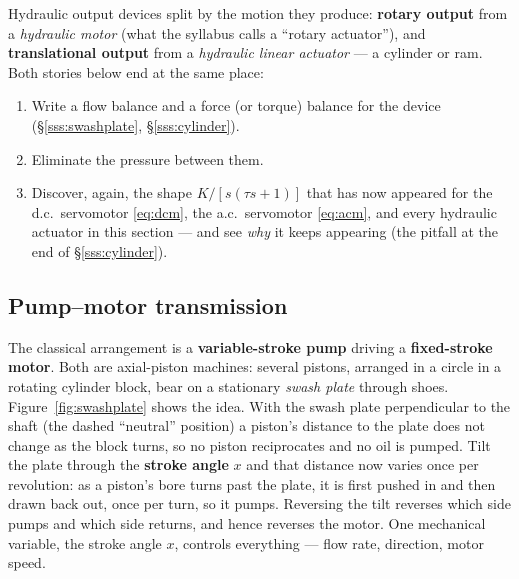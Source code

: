 \documentclass[11pt,a4paper]{article}
\begin{document}
Hydraulic output devices split by the motion they produce: \textbf{rotary
output} from a \emph{hydraulic motor} (what the syllabus calls a ``rotary
actuator''), and \textbf{translational output} from a \emph{hydraulic linear
actuator} --- a cylinder or ram. Both stories below end at the same place:
\begin{enumerate}[leftmargin=2em,itemsep=1pt]
\item Write a flow balance and a force (or torque) balance for the device
      (\S\ref{sss:swashplate}, \S\ref{sss:cylinder}).
\item Eliminate the pressure between them.
\item Discover, again, the shape $K/[s(\tau s+1)]$ that has now appeared for
      the d.c.\ servomotor \eqref{eq:dcm}, the a.c.\ servomotor \eqref{eq:acm},
      and every hydraulic actuator in this section --- and see \emph{why} it
      keeps appearing (the pitfall at the end of \S\ref{sss:cylinder}).
\end{enumerate}

\subsection{Pump--motor transmission}
\label{sec:pumpmotor}

The classical arrangement is a \textbf{variable-stroke pump} driving a
\textbf{fixed-stroke motor}. Both are axial-piston machines: several pistons,
arranged in a circle in a rotating cylinder block, bear on a stationary
\emph{swash plate} through shoes. Figure~\ref{fig:swashplate} shows the idea.
With the swash plate perpendicular to the shaft (the dashed ``neutral''
position) a piston's distance to the plate does not change as the block
turns, so no piston reciprocates and no oil is pumped. Tilt the plate through
the \textbf{stroke angle} $x$ and that distance now varies once per
revolution: as a piston's bore turns past the plate, it is first pushed in
and then drawn back out, once per turn, so it pumps. Reversing the tilt
reverses which side pumps and which side returns, and hence reverses the
motor. One mechanical variable, the stroke angle $x$, controls everything ---
flow rate, direction, motor speed.
\end{document}
